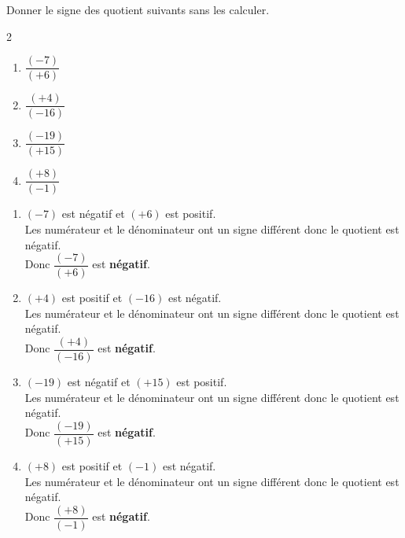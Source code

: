 \begin{exercice*}
    Donner le signe des quotient suivants sans les calculer.
    \begin{multicols}2
        \begin{spacing}{2}
            \begin{enumerate}
                \item $ \dfrac{(-7)}{(+6)} $            
                \item $ \dfrac{(+4)}{(-16)} $            
                \item $ \dfrac{(-19)}{(+15)} $
                \item $ \dfrac{(+8)}{(-1)} $            
            \end{enumerate}
        \end{spacing}
    \end{multicols}

\end{exercice*}
\begin{corrige}
        \begin{enumerate}
            \item $ (-7) $ est négatif et $ (+6) $ est positif.\\
            Les numérateur et le dénominateur ont un signe différent donc le quotient est négatif.\\
           Donc $ \dfrac{(-7)}{(+6)} $ est {\bfseries \color[HTML]{f15929}négatif}.
               \item $ (+4) $ est positif et $ (-16) $ est négatif.\\
            Les numérateur et le dénominateur ont un signe différent donc le quotient est négatif.\\
           Donc $ \dfrac{(+4)}{(-16)} $ est {\bfseries \color[HTML]{f15929}négatif}.
               \item $ (-19) $ est négatif et $ (+15) $ est positif.\\
            Les numérateur et le dénominateur ont un signe différent donc le quotient est négatif.\\
           Donc $ \dfrac{(-19)}{(+15)} $ est {\bfseries \color[HTML]{f15929}négatif}.
               \item $ (+8) $ est positif et $ (-1) $ est négatif.\\
            Les numérateur et le dénominateur ont un signe différent donc le quotient est négatif.\\
           Donc $ \dfrac{(+8)}{(-1)} $ est {\bfseries \color[HTML]{f15929}négatif}.
        \end{enumerate}
\end{corrige}

